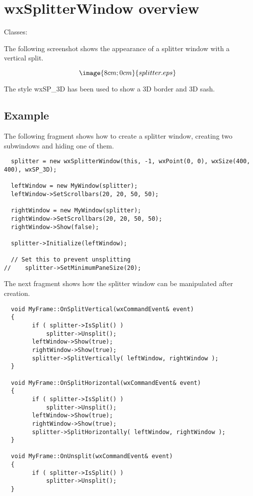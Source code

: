 \section{wxSplitterWindow overview}\label{wxsplitterwindowoverview}

Classes: 

The following screenshot shows the appearance of a splitter window with a vertical split.

$$\image{8cm;0cm}{splitter.eps}$$

The style wxSP\_3D has been used to show a 3D border and 3D sash.

\subsection{Example}\label{wxsplitterwindowexample}

The following fragment shows how to create a splitter window, creating two
subwindows and hiding one of them.

{\small
\begin{verbatim}
  splitter = new wxSplitterWindow(this, -1, wxPoint(0, 0), wxSize(400, 400), wxSP_3D);

  leftWindow = new MyWindow(splitter);
  leftWindow->SetScrollbars(20, 20, 50, 50);

  rightWindow = new MyWindow(splitter);
  rightWindow->SetScrollbars(20, 20, 50, 50);
  rightWindow->Show(false);

  splitter->Initialize(leftWindow);

  // Set this to prevent unsplitting
//    splitter->SetMinimumPaneSize(20);
\end{verbatim}
}

The next fragment shows how the splitter window can be manipulated after creation.

{\small
\begin{verbatim}
  void MyFrame::OnSplitVertical(wxCommandEvent& event)
  {
        if ( splitter->IsSplit() )
            splitter->Unsplit();
        leftWindow->Show(true);
        rightWindow->Show(true);
        splitter->SplitVertically( leftWindow, rightWindow );
  }

  void MyFrame::OnSplitHorizontal(wxCommandEvent& event)
  {
        if ( splitter->IsSplit() )
            splitter->Unsplit();
        leftWindow->Show(true);
        rightWindow->Show(true);
        splitter->SplitHorizontally( leftWindow, rightWindow );
  }

  void MyFrame::OnUnsplit(wxCommandEvent& event)
  {
        if ( splitter->IsSplit() )
            splitter->Unsplit();
  }
\end{verbatim}
}

